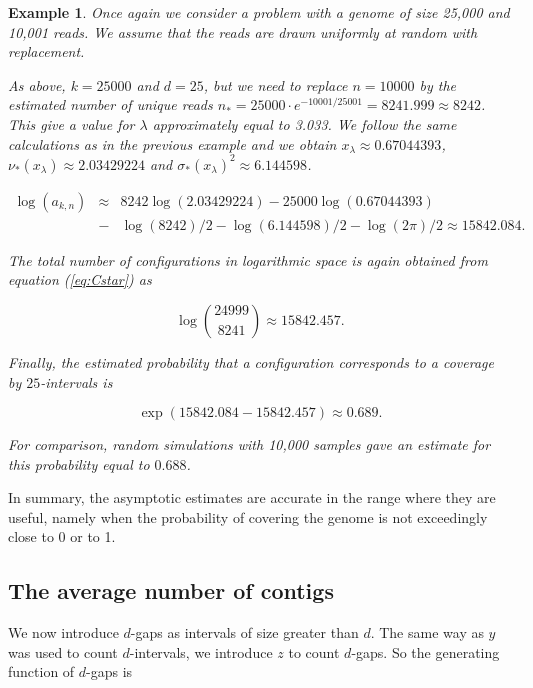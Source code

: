 \documentclass{article}
\newtheorem{example}{Example}
\begin{document}
\begin{example}

Once again we consider a problem with a genome of size 25,000 and 10,001
reads. We assume that the reads are drawn uniformly at random with
replacement.

As above, $k=25000$ and $d=25$, but we need to replace $n=10000$ by the
estimated number of unique reads $n_* = 25000 \cdot e^{-10001/25001} =
8241.999 \approx 8242$. This give a value for $\lambda$ approximately
equal to 3.033. We follow the same calculations as in the previous example
and we obtain $x_\lambda \approx 0.67044393$, $\nu_*(x_\lambda) \approx
2.03429224$ and $\sigma_*(x_\lambda)^2 \approx 6.144598$.

\begin{eqnarray*}
\log(a_{k,n}) &\approx& 8242\log(2.03429224) - 25000\log(0.67044393) \\
&-& \log(8242)/2 - \log(6.144598)/2 - \log(2\pi)/2
\approx 15842.084.
\end{eqnarray*}

The total number of configurations in logarithmic space is again
obtained from equation (\ref{eq:Cstar}) as

\begin{equation*}
\log { 24999 \choose 8241 } \approx 15842.457.
\end{equation*}

Finally, the estimated probability that a configuration corresponds to a
coverage by $25$-intervals is

\begin{equation*}
\exp(15842.084-15842.457) \approx 0.689.
\end{equation*}

For comparison, random simulations with 10,000 samples gave an estimate
for this probability equal to $0.688$.

\end{example}

In summary, the asymptotic estimates are accurate in the range where they
are useful, namely when the probability of covering the genome is not
exceedingly close to 0 or to 1.

\subsection{The average number of contigs}

We now introduce $d$-gaps as intervals of size greater than $d$. The same
way as $y$ was used to count $d$-intervals, we introduce $z$ to count
$d$-gaps. So the generating function of $d$-gaps is
\end{document}

